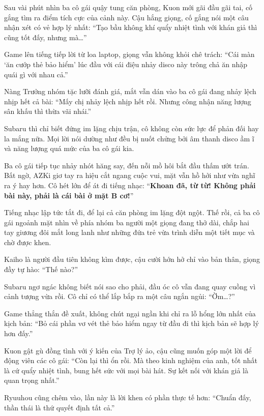 \documentclass[../main.tex]{subfiles}
\begin{document}

Sau vài phút nhìn ba cô gái quậy tung căn phòng, Kuon mới gãi đầu gãi tai, cố gắng tìm ra điểm tích cực của cảnh này. Cậu hắng giọng, cố gắng nói một câu nhận xét có vẻ hợp lý nhất: ``Tạo bầu không khí quẩy nhiệt tình với khán giả thì cũng tốt đấy, nhưng mà\dots''

Game lên tiếng tiếp lời từ loa laptop, giọng vẫn không khỏi chê trách: ``Cái màn `ăn cướp thẻ bảo hiểm' lúc đầu với cái điệu nhảy disco này trông chả ăn nhập quái gì với nhau cả.''

Nàng Trưởng nhóm tặc lưỡi đánh giá, mắt vẫn dán vào ba cô gái đang nhảy lệch nhịp hết cả bài: ``Mấy chị nhảy lệch nhịp hết rồi. Nhưng công nhận năng lượng sân khấu thì thừa vãi nhái.''

Subaru thì chỉ biết đứng im lặng chịu trận, cô không còn sức lực để phản đối hay la mắng nữa. Mọi lời nói dường như đều bị nuốt chửng bởi âm thanh disco ầm ĩ và năng lượng quá mức của ba cô gái kia.

Ba cô gái tiếp tục nhảy nhót hăng say, đến nỗi mồ hôi bắt đầu thấm ướt trán. Bất ngờ, AZKi giơ tay ra hiệu cắt ngang cuộc vui, mặt vẫn hồ hởi như vừa nghĩ ra ý hay hơn. Cô hét lớn để át đi tiếng nhạc: ``\textbf{Khoan đã, từ từ! Không phải bài này, phải là cái bài ở mặt B cơ!}''

Tiếng nhạc lập tức tắt đi, để lại cả căn phòng im lặng đột ngột. Thế rồi, cả ba cô gái ngoảnh mặt nhìn về phía nhóm ba người một giọng đang thở dài, chắp hai tay giương đôi mắt long lanh như những đứa trẻ vừa trình diễn một tiết mục và chờ được khen.


Kaiho là người đầu tiên không kìm được, cậu cười hớn hở chỉ vào bản thân, giọng đầy tự hào: ``Thế nào?''

Subaru ngơ ngác không biết nói sao cho phải, đầu óc cô vẫn đang quay cuồng vì cảnh tượng vừa rồi. Cô chỉ có thể lắp bắp ra một câu ngắn ngủi: ``Ờm\dots?''

Game thẳng thắn đề xuất, không chút ngại ngần khi chỉ ra lỗ hổng lớn nhất của kịch bản: ``Bỏ cái phần vơ vét thẻ bảo hiểm ngay từ đầu đi thì kịch bản sẽ hợp lý hơn đấy.''

Kuon gật gù đồng tình với ý kiến của Trợ lý ảo, cậu cũng muốn góp một lời để động viên các cô gái: ``Còn lại thì ổn rồi. Mà theo kinh nghiệm của anh, tốt nhất là cứ quẩy nhiệt tình, bung hết sức với mọi bài hát. Sự kết nối với khán giả là quan trọng nhất.''

Ryuuhou cũng chêm vào, lần này là lời khen có phần thực tế hơn: ``Chuẩn đấy, thần thái là thứ quyết định tất cả.''
\end{document}
